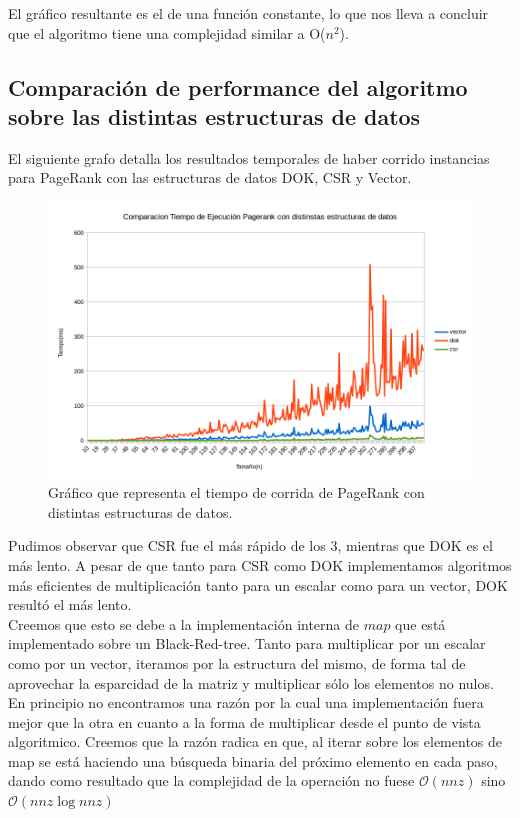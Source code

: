 El gráfico resultante es el de una función constante, lo que nos lleva a concluir que el algoritmo tiene una complejidad similar a O($n^{2}$).

\subsection{Comparación de performance del algoritmo sobre las distintas estructuras de datos}

El siguiente grafo detalla los resultados temporales de haber corrido instancias para PageRank con las estructuras de datos DOK, CSR y Vector.

\begin{figure}[h]
  \includegraphics[scale=0.4]{imagenes/comparacion-tiempo-ejecucion-csr-dok-vector.png}
   \caption{Gráfico que representa el tiempo de corrida de PageRank con distintas estructuras de datos.}
  \label{fig:img1}
\end{figure}

Pudimos observar que CSR fue el más rápido de los 3, mientras que DOK es el más lento. A pesar de que tanto para CSR como DOK implementamos algoritmos más eficientes de multiplicación tanto para un escalar como para un vector, DOK resultó el más lento. \\

Creemos que esto se debe a la implementación interna de $map$ que está implementado sobre un Black-Red-tree. Tanto para multiplicar por un escalar como por un vector, iteramos por la estructura del mismo, de forma tal de aprovechar la esparcidad de la matriz y multiplicar sólo los elementos no nulos. En principio no encontramos una razón por la cual una implementación fuera mejor que la otra en cuanto a la forma de multiplicar desde el punto de vista algoritmico. Creemos que la razón radica en que, al iterar sobre los elementos de map se está haciendo una búsqueda binaria del próximo elemento en cada paso, dando como resultado que la complejidad de la operación no fuese $\mathcal{O}(nnz)$ sino $\mathcal{O}(nnz\log{}nnz)$ \\

